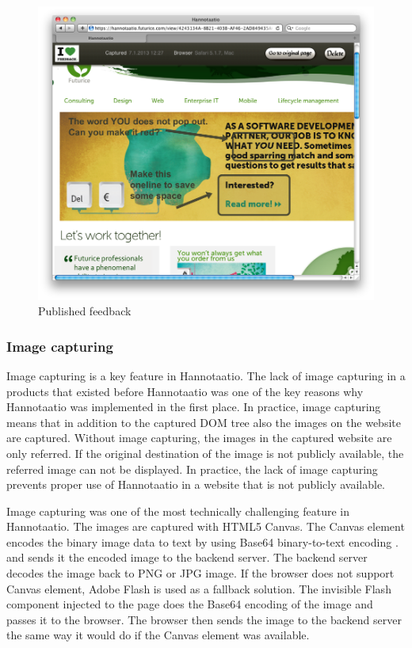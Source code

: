 \documentclass[english,12pt,a4paper,pdftex]{article}
\begin{document}
\begin{figure}[htb]
\begin{center}
\includegraphics[width=1.0\textwidth]{published_feedback.png}
\end{center}
\caption{Published feedback}
\end{figure}

\subsubsection{Image capturing}
\label{sec:image_capturing}

Image capturing is a key feature in Hannotaatio. The lack of image capturing in a products that existed before Hannotaatio was one of the key reasons why Hannotaatio was implemented in the first place. In practice, image capturing means that in addition to the captured \ac{DOM} tree also the images on the website are captured. Without image capturing, the images in the captured website are only referred. If the original destination of the image is not publicly available, the referred image can not be displayed. In practice, the lack of image capturing prevents proper use of Hannotaatio in a website that is not publicly available.

Image capturing was one of the most technically challenging feature in Hannotaatio. The images are captured with HTML5 Canvas. The Canvas element encodes the binary image data to text by using Base64 binary-to-text encoding \citep{rfc4648}. and sends it the encoded image to the backend server. The backend server decodes the image back to PNG or JPG image. If the browser does not support Canvas element, Adobe Flash is used as a fallback solution. The invisible Flash component injected to the page does the Base64 encoding of the image and passes it to the browser. The browser then sends the image to the backend server the same way it would do if the Canvas element was available.
\end{document}
